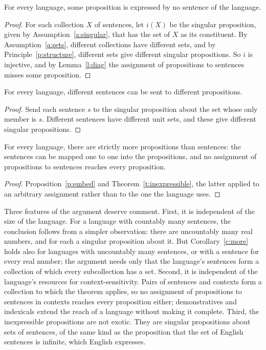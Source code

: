 \documentclass{situationist-preprint}
\begin{document}
\begin{theorem}\label{t:inexpressible}
For every language, some proposition is expressed by no sentence of the language.
\end{theorem}

\begin{proof}
For each collection $X$ of sentences, let $i(X)$ be the singular proposition, given by Assumption~\ref{a:singular}, that has the set of $X$ as its constituent. By Assumption~\ref{a:sets}, different collections have different sets, and by Principle~\ref{p:structure}, different sets give different singular propositions. So $i$ is injective, and by Lemma~\ref{l:diag} the assignment of propositions to sentences misses some proposition.
\end{proof}

\begin{proposition}\label{p:embed}
For every language, different sentences can be sent to different propositions.
\end{proposition}

\begin{proof}
Send each sentence $s$ to the singular proposition about the set whose only member is $s$. Different sentences have different unit sets, and these give different singular propositions.
\end{proof}

\begin{corollary}\label{c:more}
For every language, there are strictly more propositions than sentences: the sentences can be mapped one to one into the propositions, and no assignment of propositions to sentences reaches every proposition.
\end{corollary}

\begin{proof}
Proposition~\ref{p:embed} and Theorem~\ref{t:inexpressible}, the latter applied to an arbitrary assignment rather than to the one the language uses.
\end{proof}

Three features of the argument deserve comment. First, it is independent of the size of the language. For a language with countably many sentences, the conclusion follows from a simpler observation: there are uncountably many real numbers, and for each a singular proposition about it. But Corollary~\ref{c:more} holds also for languages with uncountably many sentences, or with a sentence for every real number; the argument needs only that the language's sentences form a collection of which every subcollection has a set. Second, it is independent of the language's resources for context-sensitivity. Pairs of sentences and contexts form a collection to which the theorem applies, so no assignment of propositions to sentences in contexts reaches every proposition either; demonstratives and indexicals extend the reach of a language without making it complete. Third, the inexpressible propositions are not exotic. They are singular propositions about sets of sentences, of the same kind as the proposition that the set of English sentences is infinite, which English expresses.
\end{document}
